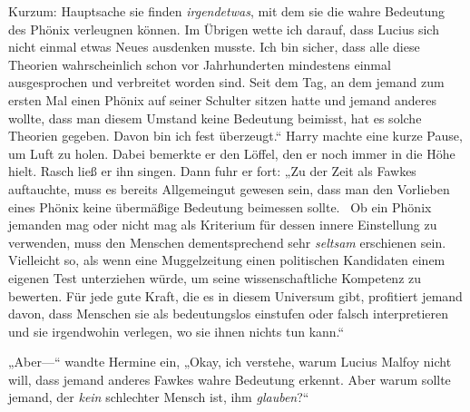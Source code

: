 %
Kurzum: Hauptsache sie finden \emph{irgendetwas}, mit dem sie die wahre Bedeutung des Phönix verleugnen können.
%
Im Übrigen wette ich darauf, dass Lucius sich nicht einmal etwas Neues ausdenken musste. Ich bin sicher, dass alle diese Theorien wahrscheinlich schon vor Jahrhunderten mindestens einmal ausgesprochen und verbreitet worden sind. Seit dem Tag, an dem jemand zum ersten Mal einen Phönix auf seiner Schulter sitzen hatte und jemand anderes wollte, dass man diesem Umstand keine Bedeutung beimisst, hat es solche Theorien gegeben. Davon bin ich fest überzeugt.“
%
Harry machte eine kurze Pause, um Luft zu holen. Dabei bemerkte er den Löffel, den er noch immer in die Höhe hielt. Rasch ließ er ihn singen.
Dann fuhr er fort: „Zu der Zeit als Fawkes auftauchte, muss es bereits Allgemeingut gewesen sein, dass man den Vorlieben eines Phönix keine übermäßige Bedeutung beimessen sollte. ~Ob ein Phönix jemanden mag oder nicht mag als Kriterium für dessen innere Einstellung zu verwenden, muss den Menschen dementsprechend sehr \emph{seltsam} erschienen sein. Vielleicht so, als wenn eine Muggelzeitung einen politischen Kandidaten einem eigenen Test unterziehen würde, um seine wissenschaftliche Kompetenz zu bewerten.
%
Für jede gute Kraft, die es in diesem Universum gibt, profitiert jemand davon, dass Menschen sie als bedeutungslos einstufen oder falsch interpretieren und sie irgendwohin verlegen, wo sie ihnen nichts tun kann.“

„Aber—“ wandte Hermine ein, „Okay, ich verstehe, warum Lucius Malfoy nicht will, dass jemand anderes Fawkes wahre Bedeutung erkennt. Aber warum sollte jemand, der \emph{kein} schlechter Mensch ist, ihm \emph{glauben}?“


